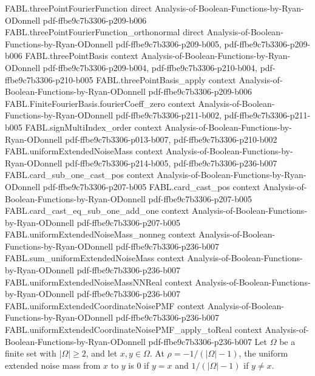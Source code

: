 \begin{theorem}
\proofstep
  {FABL.threePointFourierFunction}
  {direct}
  {Analysis-of-Boolean-Functions-by-Ryan-ODonnell}
  {pdf-ffbe9c7b3306-p209-b006}
\proofstep
  {FABL.threePointFourierFunction_orthonormal}
  {direct}
  {Analysis-of-Boolean-Functions-by-Ryan-ODonnell}
  {pdf-ffbe9c7b3306-p209-b005,
    pdf-ffbe9c7b3306-p209-b006}
\proofstep
  {FABL.threePointBasis}
  {context}
  {Analysis-of-Boolean-Functions-by-Ryan-ODonnell}
  {pdf-ffbe9c7b3306-p209-b004,
    pdf-ffbe9c7b3306-p210-b004,
    pdf-ffbe9c7b3306-p210-b005}
\proofstep
  {FABL.threePointBasis_apply}
  {context}
  {Analysis-of-Boolean-Functions-by-Ryan-ODonnell}
  {pdf-ffbe9c7b3306-p209-b006}
\proofstep
  {FABL.FiniteFourierBasis.fourierCoeff_zero}
  {context}
  {Analysis-of-Boolean-Functions-by-Ryan-ODonnell}
  {pdf-ffbe9c7b3306-p211-b002,
    pdf-ffbe9c7b3306-p211-b005}
\proofstep
  {FABL.signMultiIndex_order}
  {context}
  {Analysis-of-Boolean-Functions-by-Ryan-ODonnell}
  {pdf-ffbe9c7b3306-p013-b007,
    pdf-ffbe9c7b3306-p210-b002}
\proofstep
  {FABL.uniformExtendedNoiseMass}
  {context}
  {Analysis-of-Boolean-Functions-by-Ryan-ODonnell}
  {pdf-ffbe9c7b3306-p214-b005,
    pdf-ffbe9c7b3306-p236-b007}
\proofstep
  {FABL.card_sub_one_cast_pos}
  {context}
  {Analysis-of-Boolean-Functions-by-Ryan-ODonnell}
  {pdf-ffbe9c7b3306-p207-b005}
\proofstep
  {FABL.card_cast_pos}
  {context}
  {Analysis-of-Boolean-Functions-by-Ryan-ODonnell}
  {pdf-ffbe9c7b3306-p207-b005}
\proofstep
  {FABL.card_cast_eq_sub_one_add_one}
  {context}
  {Analysis-of-Boolean-Functions-by-Ryan-ODonnell}
  {pdf-ffbe9c7b3306-p207-b005}
\proofstep
  {FABL.uniformExtendedNoiseMass_nonneg}
  {context}
  {Analysis-of-Boolean-Functions-by-Ryan-ODonnell}
  {pdf-ffbe9c7b3306-p236-b007}
\proofstep
  {FABL.sum_uniformExtendedNoiseMass}
  {context}
  {Analysis-of-Boolean-Functions-by-Ryan-ODonnell}
  {pdf-ffbe9c7b3306-p236-b007}
\proofstep
  {FABL.uniformExtendedNoiseMassNNReal}
  {context}
  {Analysis-of-Boolean-Functions-by-Ryan-ODonnell}
  {pdf-ffbe9c7b3306-p236-b007}
\proofstep
  {FABL.uniformExtendedCoordinateNoisePMF}
  {context}
  {Analysis-of-Boolean-Functions-by-Ryan-ODonnell}
  {pdf-ffbe9c7b3306-p236-b007}
\proofstep
  {FABL.uniformExtendedCoordinateNoisePMF_apply_toReal}
  {context}
  {Analysis-of-Boolean-Functions-by-Ryan-ODonnell}
  {pdf-ffbe9c7b3306-p236-b007}
Let $\Omega$ be a finite set with $|\Omega|\ge 2$, and let $x,y\in\Omega$. At
$\rho=-1/(|\Omega|-1)$, the uniform extended noise mass from $x$ to $y$ is $0$ if $y=x$
and $1/(|\Omega|-1)$ if $y\ne x$.
\end{theorem}

